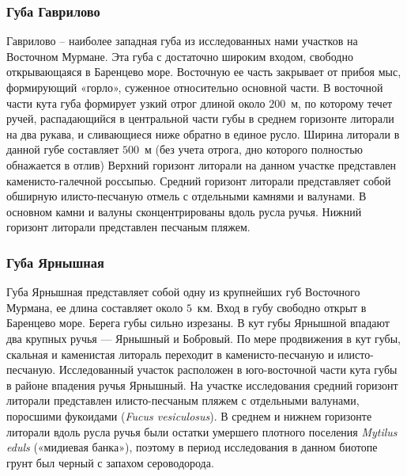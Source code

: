 \subsubsection{Губа Гаврилово}
Гаврилово – наиболее западная губа из исследованных нами участков на Восточном Мурмане. 
Эта   губа   с  достаточно   широким   входом,   свободно   открывающаяся  в  Баренцево море.   
Восточную   ее   часть   закрывает   от   прибоя   мыс,   формирующий   «горло», суженное относительно основной части. 
В восточной части кута губа формирует узкий отрог длиной   около $200$~м, по которому течет ручей, распадающийся в центральной части   губы  в  среднем   горизонте   литорали   на   два   рукава,   и   сливающиеся   ниже   обратно   в единое русло.
Ширина литорали  в  данной губе составляет  $500$~м  (без  учета отрога, дно которого полностью обнажается в отлив) Верхний горизонт литорали на данном участке представлен каменисто-галечной   россыпью.   
Средний   горизонт   литорали   представляет   собой   обширную илисто-песчаную   отмель   с   отдельными   камнями   и   валунами.  
В   основном   камни   и   валуны сконцентрированы   вдоль   русла   ручья.   
Нижний   горизонт   литорали   представлен   песчаным пляжем. 

\subsubsection{Губа Ярнышная}
Губа Ярнышная представляет собой одну из крупнейших губ Восточного Мурмана, ее длина составляет около $5$~км. 
Вход в губу свободно открыт в Баренцево море. 
Берега губы сильно изрезаны. 
В кут губы Ярнышной впадают два крупных ручья --- Ярнышный и Бобровый. 
По мере продвижения в кут губы, скальная и каменистая литораль переходит в каменисто-песчаную и илисто-песчаную. 
Исследованный участок расположен в юго-восточной части кута губы в районе впадения ручья Ярнышный.
На   участке   исследования   средний   горизонт   литорали   представлен   илисто-песчаным пляжем   с   отдельными   валунами,   поросшими   фукоидами   ({\it Fucus   vesiculosus}).   
В   среднем   и нижнем горизонте литорали вдоль русла ручья были остатки умершего плотного поселения  {\it Mytilus eduls} («мидиевая банка»), поэтому в период исследования в данном биотопе грунт был черный с запахом сероводорода.

